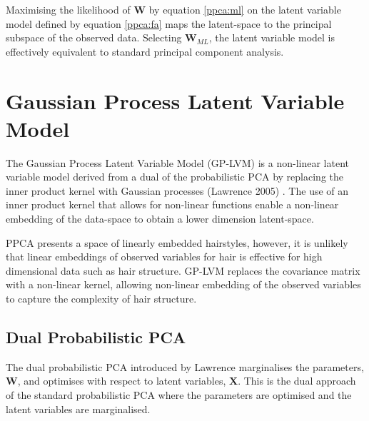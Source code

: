 \documentclass[ %
                    author={Dillon Keith Diep [INCOMPLETE DRAFT, NOT FOR SUBMISSION]},
                supervisor={Dr. Carl Henrik Ek},
                    degree={MEng},
                     title={ARt-CG:},
                  subtitle={Assisted Real-time Content Generation of 3D Hair by Learning Manifolds},
                      type={Research},
                      year={2014} ]{dissertation}
\begin{document}
Maximising the likelihood of $\mathbf{W}$ by equation \ref{ppca:ml} on the latent variable model defined by equation \ref{ppca:fa} maps the latent-space to the principal subspace of the observed data. Selecting $\mathbf{W}_{ML}$, the latent variable model is effectively equivalent to standard principal component analysis.

\section{Gaussian Process Latent Variable Model}
The Gaussian Process Latent Variable Model (GP-LVM) is a non-linear latent variable model derived from a dual of the probabilistic PCA by replacing the inner product kernel with Gaussian processes (Lawrence 2005) \cite{gplvm}. The use of an inner product kernel that allows for non-linear functions enable a non-linear embedding of the data-space to obtain a lower dimension latent-space. 

{\color{red}
PPCA presents a space of linearly embedded hairstyles, however, it is unlikely that linear embeddings of observed variables for hair is effective for high dimensional data such as hair structure. GP-LVM replaces the covariance matrix with a non-linear kernel, allowing non-linear embedding of the observed variables to capture the complexity of hair structure.
}

\subsection{Dual Probabilistic PCA}
The dual probabilistic PCA introduced by Lawrence marginalises the parameters, $\mathbf{W}$, and optimises with respect to latent variables, $\mathbf{X}$. This is the dual approach of the standard probabilistic PCA where the parameters are optimised and the latent variables are marginalised.
\end{document}
